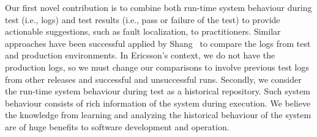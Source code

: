Our first novel contribution is to combine both run-time system behaviour during test (i.e., logs) and test results (i.e., pass or failure of the test) to provide actionable suggestions, such as fault localization, to practitioners. Similar approaches have been successful applied by Shang~\cite{Shang:2013:ADB:2486788.2486842} to compare the logs from test and production environments. In Ericsson's context, we do not have the production logs, so we must change our comparisons to involve previous test logs from other releases and successful and unsuccessful runs. Secondly, we consider the run-time system behaviour during test as a historical repository. Such system behaviour consists of rich information of the system during execution. We believe the knowledge from learning and analyzing the historical behaviour of the system are of huge benefits to software development and operation.


